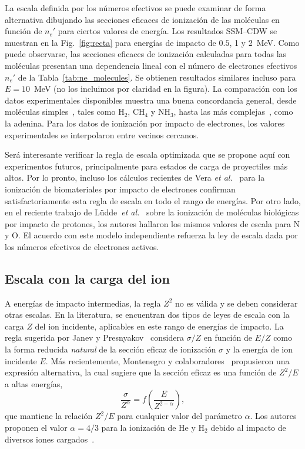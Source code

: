 La escala definida por los números efectivos se puede examinar de forma 
alternativa dibujando las secciones eficaces de ionización de las 
moléculas en función de $n_e'$ para ciertos valores de energía. Los 
resultados SSM--CDW se muestran en la Fig.~\ref{fig:recta} para 
energías de impacto de $0.5$, 1 y 2~MeV. Como puede observarse, las 
secciones eficaces de ionización calculadas para todas las moléculas 
presentan una dependencia lineal con el número de electrones efectivos 
$n_e'$ de la Tabla~\ref{tab:ne_molecules}. Se obtienen resultados 
similares incluso para $E=10$~MeV (no los incluimos por claridad en la 
figura). La comparación con los datos experimentales disponibles muestra 
una buena concordancia general, desde moléculas simples~\cite{Lynch:76,
Rudd:85,Luna2007}, tales como H$_2$, CH$_4$ y NH$_3$, hasta las más 
complejas~\cite{Iriki:11,itoh2013,wolff2014}, como la adenina. Para los 
datos de ionización por impacto de electrones, los valores 
experimentales se interpolaron entre vecinos cercanos. 

Será interesante verificar la regla de escala optimizada que se propone
aquí con experimentos futuros, principalmente para estados de carga de 
proyectiles más altos. Por lo pronto, incluso los cálculos recientes 
de Vera \textit{et al.}~\cite{deVera:20} para la ionización de 
biomateriales por impacto de electrones confirman satisfactoriamente
esta regla de escala en todo el rango de energías. Por otro lado, en el 
reciente trabajo de L\"udde~\textit{et al.}~\cite{Ludde:19} sobre la 
ionización de moléculas biológicas por impacto de protones, los autores 
hallaron los mismos valores de escala para N y O. El acuerdo con este 
modelo independiente refuerza la ley de escala dada por los números 
efectivos de electrones activos.

\subsection{Escala con la carga del ion}
\label{sec:zscaling}

A energías de impacto intermedias, la regla $Z^2$ no es válida y se 
deben considerar otras escalas. En la literatura, se encuentran dos 
tipos de leyes de escala con la carga $Z$ del ion incidente, aplicables 
en este rango de energías de impacto. La regla sugerida por Janev y 
Presnyakov~\cite{Janev:80} considera $\sigma/Z$ en función de $E/Z$ como 
la forma reducida \textit{natural} de la sección eficaz de ionización 
$\sigma$ y la energía de ion incidente $E$. Más recientemente, 
Montenegro y colaboradores~\cite{Dubois:13,Montenegro:13} propusieron 
una expresión alternativa, la cual sugiere que la sección eficaz es una 
función de $Z^2/E$ a altas energías,
\begin{equation}
\frac{\sigma}{Z^{\alpha}}=f\left(\frac{E}{Z^{2-\alpha}}\right),
\label{eq:Montenegro}
\end{equation}
que mantiene la relación $Z^2/E$ para cualquier valor del parámetro 
$\alpha$. Los autores proponen el valor $\alpha=4/3$ para la ionización 
de He y H$_2$ debido al impacto de diversos iones 
cargados~\cite{Dubois:13}. 

